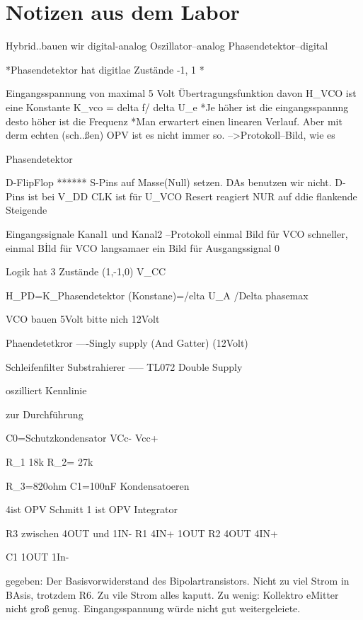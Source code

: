 \section{Notizen aus dem Labor}

Hybrid..bauen wir digital-analog
Oszillator--analog
Phasendetektor--digital

*Phasendetektor hat digitlae Zustände -1, 1 *


Eingangsspannung von maximal 5 Volt
Übertragungsfunktion davon
H_VCO ist eine Konstante K_vco = delta f/ delta U_e
*Je höher ist die eingangsspannng desto höher ist die Frequenz
*Man erwartert einen linearen Verlauf. Aber mit derm echten (sch..ßen) OPV ist es nicht immer so.
-->Protokoll--Bild, wie es 

Phasendetektor

D-FlipFlop
******
S-Pins auf Masse(Null) setzen. DAs benutzen wir nicht.
D-Pins ist bei V_DD
CLK ist für U_VCO
Resert reagiert NUR auf ddie flankende Steigende

Eingangssignale Kanal1 und Kanal2
--Protokoll einmal Bild für VCO schneller,  einmal Bİld für VCO langsamaer ein Bild für Ausgangssignal 0

Logik hat 3 Zustände  (1,-1,0) V_CC

H_PD=K_Phasendetektor (Konstane)=/elta U_A /Delta phasemax



VCO bauen 5Volt bitte nich 12Volt

Phaendetetkror ----Singly supply
(And Gatter)  (12Volt)


Schleifenfilter
Substrahierer ----- TL072 
Double Supply






oszilliert Kennlinie





\Notizen zur Durchführung

C0=Schutzkondensator VCc- Vcc+

R_1 18k
R_2= 27k

R_3=820ohm
C1=100nF Kondensatoeren

4ist OPV Schmitt 1 ist OPV Integrator

R3 zwischen 4OUT und 1IN-
R1  4IN+ 1OUT 
R2 4OUT 4IN+

C1 1OUT 1In-

gegeben: Der Basisvorwiderstand des Bipolartransistors. Nicht zu viel Strom in BAsis, trotzdem R6. Zu vile Strom alles kaputt. Zu wenig: Kollektro eMitter nicht groß genug. Eingangsspannung würde nicht gut weitergeleiete.

